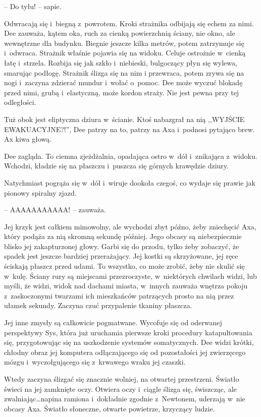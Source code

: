 \documentclass[oneside,polish,11pt,sfheadings]{mwbk}
\begin{document}
-- Do tyłu! -- sapie.

Odwracają się i~biegną z~powrotem. Kroki strażnika odbijają się echem za
nimi. Dee zauważa, kątem oka, ruch za cienką powierzchnią ściany, nie
okno, ale wewnętrzne dla budynku. Biegnie jeszcze kilka metrów, potem
zatrzymuje się i~odwraca. Strażnik właśnie pojawia się na widoku. Celuje
ostrożnie w~cienką łatę i~strzela. Rozbija się jak szkło i~niebieski,
bulgoczący płyn się wylewa, smarując podłogę. Strażnik ślizga się na nim
i przewraca, potem zrywa się na nogi i~zaczyna zdzierać mundur i~wołać o~pomoc. Dee może wyczuć blokadę przed nimi, grubą i~elastyczną, może
kordon straży. Nie jest pewna przy tej odległości.

Tuż obok jest eliptyczna dziura w~ścianie. Ktoś nabazgrał na nią
,,WYJŚCIE EWAKUACYJNE?!'', Dee patrzy na to, patrzy na Axa i~podnosi
pytająco brew. Ax kiwa głową.

Dee zagląda. To ciemna zjeżdżalnia, opadająca ostro w~dół i~znikająca z~widoku. Wchodzi, kładzie się na płaszczu i~puszcza się górnych krawędzie
dziury.

Natychmiast pogrąża się w~dół i~wiruje dookoła czegoś, co wydaje się
prawie jak pionowy spiralny zjazd. 

-- AAAAAAAAAAA! -- zauważa. 

Jej krzyk
jest całkiem mimowolny, ale wychodzi zbyt późno, żeby zniechęcić Axa,
który podąża za nią skromną sekundę później. Jego obcasy są
niebezpiecznie blisko jej zakapturzonej głowy. Garbi się do przodu,
tylko żeby zobaczyć, że spadek jest jeszcze bardziej przerażający. Jej
kostki są skrzyżowane, jej ręce ściskają płaszcz przed udami. To
wszystko, co może zrobić, żeby nie skulić się w~kulę. Ściany rury są
miejscami przezroczyste, w~niektórych chwilach widzi, lub myśli, że
widzi, widok nad dachami miasta, w~innych zauważa wnętrza pokoju z~zaskoczonymi twarzami ich mieszkańców patrzących prosto na nią przez
ułamek sekundy. Zaczyna czuć przypalenie tkaniny płaszcza.

Jej inne zmysły są całkowicie pogmatwane. Wycofuje się od oderwanej
perspektywy Sys, która już uruchamia pierwsze kroki procedury
katapultowania się, przygotowując się na uszkodzenie systemów
somatycznych. Dee widzi krótki, chłodny obraz jej komputera
odłączającego się od pozostałości jej zwierzęcego mózgu i~wyczołgującego
się z~krwawego wraku jej czaszki.

Wtedy zaczyna ślizgać się znacznie wolniej, na otwartej przestrzeni.
Światło świeci na jej zamknięte oczy. Otwiera oczy i~ciągle ślizga się,
świszcząc, ale zwalniając\ldots napina ramiona i~dokładnie zgodnie z~Newtonem, uderzają w~nie obcasy Axa. Światło słoneczne, otwarte
powietrze, krzyczący ludzie.
\end{document}
